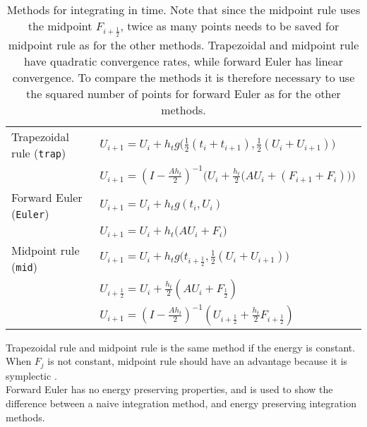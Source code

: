\begin{table}
\begin{tabular}{l l}
	Trapezoidal rule (\texttt{trap}) \cite{trapezoidal} & $U_{i+1} = U_{i}+h_t g \Big( \frac{1}{2}(t_i+t_{i+1}),\frac{1}{2}(U_i+U_{i+1}) \Big)$
	\\ & $U_{i+1} = (I- \frac{A h_t}{2}) ^{-1} \Big(  U_i + \frac{h_t}{2} \big( A U_i+(F_{i+1}+F_i) \big)  \Big) $\\
\hline	
	Forward Euler (\texttt{Euler}) \cite{forwardeuler} & $ U_{i+1} = U_i + h_t g ( t_i, U_i ) $ \\ & $ U_{i+1} = U_i + h_t \big( A U_i + F_i \big) $ \\
	\hline
	Midpoint rule (\texttt{mid}) \cite{midpoint} & $U_{i+1} = U_i + h_t g \Big(  t_{i+\frac{1}{2}} , \frac{1}{2}(U_i + U_{i+1})    \Big) $ \\ & 
	$U_{i+\frac{1}{2}} = U_i + \frac{h_t}{2} ( A U_i + F_{\frac{1}{2}} )$ \\ &
    $U_{i+1} = (I-\frac{A h_t}{2}) ^{-1} (U_{i+\frac{1}{2}} + \frac{h_t}{2} F_{i+ \frac{1}{2}})$
    
    
\end{tabular}

\caption{Methods for integrating in time. Note that since the midpoint rule uses the midpoint $F_{i+\frac{1}{2}}$, twice as many points needs to be saved for midpoint rule as for the other methods. Trapezoidal and midpoint rule have quadratic convergence rates, while forward Euler has linear convergence. To compare the methods it is therefore necessary to use the squared number of points for forward Euler as for the other methods.} 
\label{tab:intmet}
\end{table}
Trapezoidal rule and midpoint rule is the same method if the energy is constant. When $F_j$  is not constant, midpoint rule should have an advantage because it is symplectic \cite{symplecticintegrator}. \\

Forward Euler has no energy preserving properties, and is used to show the difference between a naive integration method, and energy preserving integration methods. \\

